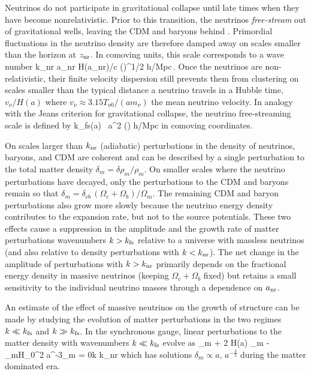 Neutrinos do not participate in gravitational collapse until late times when they have become nonrelativistic. Prior to this transition, the neutrinos {\em free-stream} out of gravitational wells, leaving the CDM and baryons behind  \cite{Bond:1983hb, Ma:1996za, Hu:1997vi, Hu:1997mj}. Primordial fluctuations in the neutrino density are therefore damped away on scales smaller than the horizon at $z_{\rm nr}$. In comoving units, this scale corresponds to a wave number
\beq
k_{\rm nr} \equiv a_{\rm nr} H(a_{\rm nr})/c  \left(\right)^{1/2} h/{\rm Mpc}\,.
\eeq
Once the neutrinos are non-relativistic, their finite velocity dispersion still prevents them from clustering on scales smaller than the typical distance a neutrino travels in a Hubble time, $v_\nu /H(a)$ where $v_\nu \approx 3.15 T_{\nu 0}/(a m_\nu)$ the mean neutrino velocity. In analogy with the Jeans criterion for gravitational collapse, the neutrino free-streaming scale is defined by \cite{Bond:1983hb, Lesgourgues:2006nd}
\beq
k_{\rm fs}(a) \equiv {} \, a^2 \left(\right) h/{\rm Mpc}
\eeq
in comoving coordinates. 

On scales larger than $k_{\rm nr}$ (adiabatic) perturbations in the density of neutrinos, baryons, and CDM are coherent and can be described by a single perturbation to the total matter density $\delta_m= \delta \rho_m/\rho_m$. On smaller scales where the neutrino perturbations have decayed, only the perturbations to the CDM and baryons remain so that $\delta_{m} = \delta_{cb}\, (\Omega_{c} + \Omega_b)/\Omega_m $. The remaining CDM and baryon perturbations also grow more slowly because the neutrino energy density contributes to the expansion rate, but not to the source potentials. These two effects cause a suppression in the amplitude and the growth rate of matter perturbations wavenumbers $k > k_{\rm fs}$ relative to a universe with massless neutrinos (and also relative to density perturbations with $k<k_{\rm nr}$). The net change in the amplitude of perturbations with $k > k_{\rm nr}$ primarily depends on the fractional energy density in massive neutrinos (keeping $\Omega_c+\Omega_b$ fixed) but retains a small sensitivity to the individual neutrino masses through a dependence on $a_{\rm nr}$. 

An estimate of the effect of massive neutrinos on the growth of structure can be made by studying the evolution of matter perturbations in the two regimes $k\ll k_{\rm fs}$ and $k\gg k_{\rm fs}$.  In the synchronous gauge, linear perturbations to the matter density with wavenumbers $k \ll k_{\rm fs}$ evolve as
\beq
\label{eq:ddotdeltalarge}
\ddot{\delta}_m + 2 H(a) \dot\delta_m - \Omega_mH_0^2 a^{-3}\delta_m = 0\quad k \ll k_{\rm nr}
\eeq
which has solutions $\delta_m \propto a, \, a^{-\frac{3}{2}}$ during the matter dominated era. %

